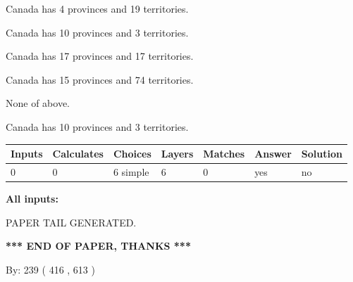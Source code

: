 \documentclass[12pt]{article}
\begin{document}
 
Canada has   4 provinces and  19 territories.
 
 
Canada has 10  provinces and 3 territories.
 
 
Canada has  17 provinces and  17 territories.
 
 
Canada has  15 provinces and  74 territories.
 
 
 None of above.
 
 
\noindent{}
 
 
Canada has 10  provinces and 3 territories.
 
 
\noindent{}
 
 
   
   
   
   
\noindent\begin{tabular}{|l|l|l|l|l|l|l|}
 \hline
Inputs & Calculates & Choices & Layers & Matches & Answer & Solution \\ \hline
 0  & 
 0  & 
 6
  simple  
  & 
 6  & 
 0  & 
  yes & 
  no 
  \\ \hline
 \end{tabular}
   
   
   
   
\noindent{}
   
   
   
   
\noindent\vspace{0.1in}\hspace{-0.08in} {\textbf{\Large{All inputs: }}}
   
   
   
   
   
   
 \vspace{0.2in}
 
   
   
\vspace{2.0in} PAPER TAIL GENERATED.
   
   
   
   
\vspace{1.0in} 
{\textbf{\large{ *** END OF PAPER, THANKS *** }}} 
   
   
\hspace{1.0in} By: 
 239 ( 416 ,  613 )
   
\end{document}
